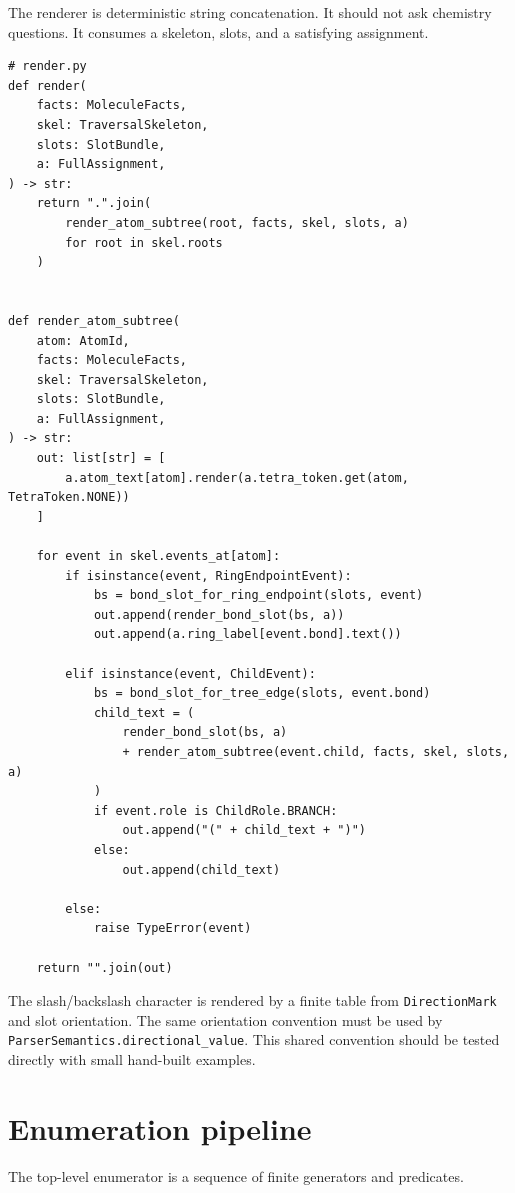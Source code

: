 \documentclass[10pt,a4paper]{article}
\theoremstyle{definition}
\theoremstyle{remark}
\begin{document}
The renderer is deterministic string concatenation.  It should not ask chemistry
questions.  It consumes a skeleton, slots, and a satisfying assignment.

\begin{lstlisting}
# render.py
def render(
    facts: MoleculeFacts,
    skel: TraversalSkeleton,
    slots: SlotBundle,
    a: FullAssignment,
) -> str:
    return ".".join(
        render_atom_subtree(root, facts, skel, slots, a)
        for root in skel.roots
    )


def render_atom_subtree(
    atom: AtomId,
    facts: MoleculeFacts,
    skel: TraversalSkeleton,
    slots: SlotBundle,
    a: FullAssignment,
) -> str:
    out: list[str] = [
        a.atom_text[atom].render(a.tetra_token.get(atom, TetraToken.NONE))
    ]

    for event in skel.events_at[atom]:
        if isinstance(event, RingEndpointEvent):
            bs = bond_slot_for_ring_endpoint(slots, event)
            out.append(render_bond_slot(bs, a))
            out.append(a.ring_label[event.bond].text())

        elif isinstance(event, ChildEvent):
            bs = bond_slot_for_tree_edge(slots, event.bond)
            child_text = (
                render_bond_slot(bs, a)
                + render_atom_subtree(event.child, facts, skel, slots, a)
            )
            if event.role is ChildRole.BRANCH:
                out.append("(" + child_text + ")")
            else:
                out.append(child_text)

        else:
            raise TypeError(event)

    return "".join(out)
\end{lstlisting}

The slash/backslash character is rendered by a finite table from
\texttt{DirectionMark} and slot orientation.  The same orientation convention
must be used by \texttt{ParserSemantics.directional\_value}.  This shared
convention should be tested directly with small hand-built examples.

\section{Enumeration pipeline}
\label{s:pipeline}

The top-level enumerator is a sequence of finite generators and predicates.
\end{document}
